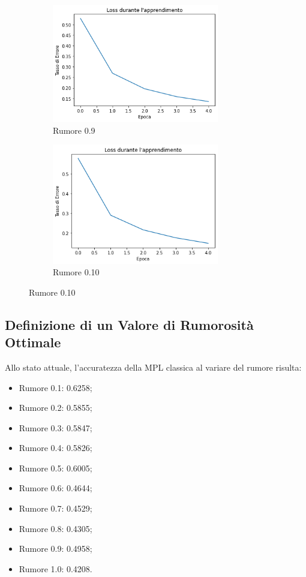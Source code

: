\documentclass[12pt, a4paper]{article}
\begin{document}
\begin{figure}[H]
    \begin{subfigure}{0.5\textwidth}
        \centering
        \caption{Rumore 0.9}
        \includegraphics[width=0.80\textwidth]{Rumore9.png}
    \end{subfigure}    
    \begin{subfigure}{0.5\textwidth}
        \centering
        \caption{Rumore 0.10}
        \includegraphics[width=0.80\textwidth]{Rumore10.png}
    \end{subfigure}       
\end{figure} 

\subsection{Definizione di un Valore di Rumorosità Ottimale}
Allo stato attuale, l'accuratezza della MPL classica al variare del rumore risulta:
\begin{itemize}
    \item Rumore 0.1: 0.6258;
    \item Rumore 0.2: 0.5855;
    \item Rumore 0.3: 0.5847;
    \item Rumore 0.4: 0.5826;
    \item Rumore 0.5: 0.6005;
    \item Rumore 0.6: 0.4644;
    \item Rumore 0.7: 0.4529;
    \item Rumore 0.8: 0.4305;
    \item Rumore 0.9: 0.4958;
    \item Rumore 1.0: 0.4208.
\end{itemize}
\end{document}
